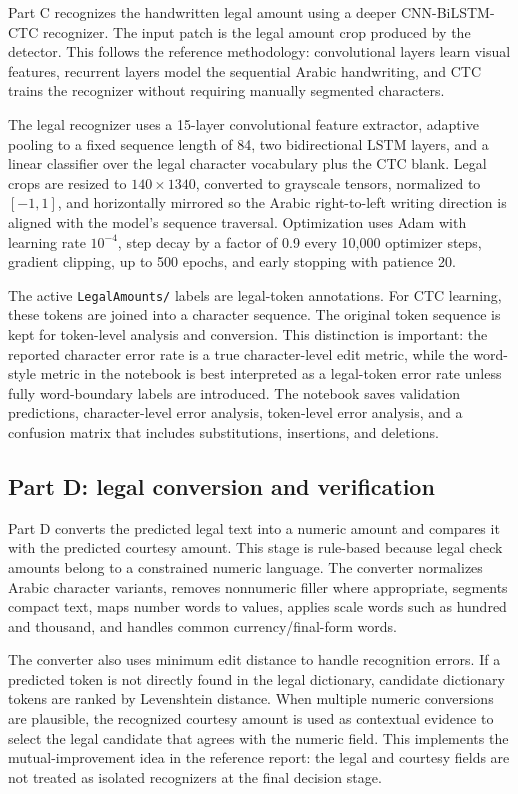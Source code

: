 \documentclass{article}
\begin{document}
Part C recognizes the handwritten legal amount using a deeper CNN-BiLSTM-CTC recognizer. The input patch is the legal amount crop produced by the detector. This follows the reference methodology: convolutional layers learn visual features, recurrent layers model the sequential Arabic handwriting, and CTC trains the recognizer without requiring manually segmented characters.

The legal recognizer uses a 15-layer convolutional feature extractor, adaptive pooling to a fixed sequence length of 84, two bidirectional LSTM layers, and a linear classifier over the legal character vocabulary plus the CTC blank. Legal crops are resized to \(140 \times 1340\), converted to grayscale tensors, normalized to \([-1,1]\), and horizontally mirrored so the Arabic right-to-left writing direction is aligned with the model's sequence traversal. Optimization uses Adam with learning rate \(10^{-4}\), step decay by a factor of 0.9 every 10,000 optimizer steps, gradient clipping, up to 500 epochs, and early stopping with patience 20.

The active \texttt{LegalAmounts/} labels are legal-token annotations. For CTC learning, these tokens are joined into a character sequence. The original token sequence is kept for token-level analysis and conversion. This distinction is important: the reported character error rate is a true character-level edit metric, while the word-style metric in the notebook is best interpreted as a legal-token error rate unless fully word-boundary labels are introduced. The notebook saves validation predictions, character-level error analysis, token-level error analysis, and a confusion matrix that includes substitutions, insertions, and deletions.

\subsection{Part D: legal conversion and verification}

Part D converts the predicted legal text into a numeric amount and compares it with the predicted courtesy amount. This stage is rule-based because legal check amounts belong to a constrained numeric language. The converter normalizes Arabic character variants, removes nonnumeric filler where appropriate, segments compact text, maps number words to values, applies scale words such as hundred and thousand, and handles common currency/final-form words.

The converter also uses minimum edit distance to handle recognition errors. If a predicted token is not directly found in the legal dictionary, candidate dictionary tokens are ranked by Levenshtein distance. When multiple numeric conversions are plausible, the recognized courtesy amount is used as contextual evidence to select the legal candidate that agrees with the numeric field. This implements the mutual-improvement idea in the reference report: the legal and courtesy fields are not treated as isolated recognizers at the final decision stage.
\end{document}
